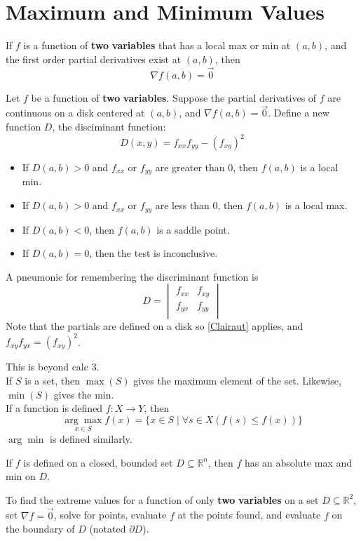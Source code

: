 \section{Maximum and Minimum Values}
\begin{theorem}
    If \(f\) is a function of \textbf{two} \textbf{variables} that has a local max or min at \((a,b)\), and the first order partial derivatives exist at \((a,b)\), then
    \[
        \nabla f(a,b)=\vec{0}
    \]
\end{theorem}
\begin{theorem}
    Let \(f\) be a function of \textbf{two} \textbf{variables}. Suppose the partial derivatives of \(f\) are continuous on a disk centered at \((a,b)\), and \(\nabla f(a,b)=\vec{0}\). Define a new function \(D\), the disciminant function:
    \[
        D(x,y)=f_{xx}f_{yy}-\left(f_{xy}\right)^2
    \]
    \begin{itemize}
        \item If \(D(a,b)>0\) and \(f_{xx} \) or \(f_{yy} \) are greater than 0, then \(f(a,b)\) is a local min.
        \item If \(D(a,b)>0\) and \(f_{xx} \) or \(f_{yy} \) are less than 0, then \(f(a,b)\) is a local max.
        \item If \(D(a,b)<0\), then \(f(a,b)\) is a saddle point.
        \item If \(D(a,b)=0\), then the test is inconclusive.
    \end{itemize}
\end{theorem}
\begin{remark}
    A pneumonic for remembering the discriminant function is 
    \[
        D=\begin{vmatrix}
            f_{xx}  &f_{xy}    \\
             f_{yx} &f_{yy}    \\
        \end{vmatrix}
    \]
    Note that the partials are defined on a disk so \ref{Clairaut} applies, and \(f_{xy}f_{yx}=(f_{xy})^2   \).
\end{remark}
\begin{notation}
    This is beyond calc 3.\\
    If \(S\) is a set, then \(\max (S)\) gives the maximum element of the set. Likewise, \(\min (S)\) gives the min.\\
    If a function is defined \(f:X\to Y\), then
    \[
        \underset{x\in S}{\arg\max}f(x)=\{ x\in S\mid \forall s\in X(f(s)\leq f(x)) \} 
    \]
    \(\arg \min \) is defined similarly.
\end{notation}
\begin{theorem}
    If \(f\) is defined on a closed, bounded set \(D\subseteq \mathbb{R}^n \), then \(f\) has an absolute max and min on \(D\).
\end{theorem}
To find the extreme values for a function of only \textbf{two} \textbf{variables} on a set \(D\subseteq \mathbb{R} ^2\), set \(\nabla f=\vec{0}\), solve for points, evaluate \(f\) at the points found, and evaluate \(f\) on the boundary of \(D\) (notated \(\partial D\)).\\
